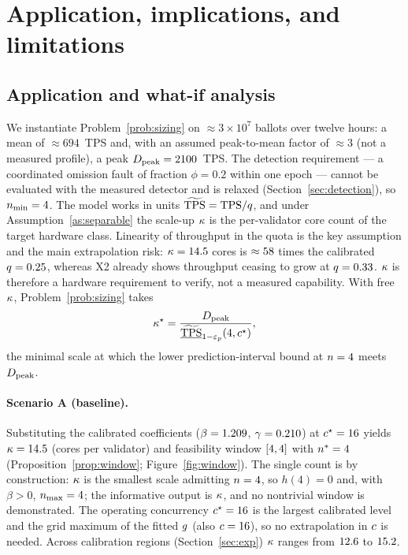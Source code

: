 \section{Application, implications, and limitations}
\label{sec:case}

\subsection{Application and what-if analysis}

We instantiate Problem~\ref{prob:sizing} on $\approx3\times10^{7}$ ballots over
twelve hours: a mean of $\approx694$~TPS and, with an assumed peak-to-mean
factor of $\approx3$ (not a measured profile), a peak $D_{\mathrm{peak}}=2100$~TPS.
The detection requirement --- a coordinated omission fault of fraction
$\phi=0.2$ within one epoch --- cannot be evaluated with the measured detector
and is relaxed (Section~\ref{sec:detection}), so $\nmin=\resNminCase$. The model
works in \RNM{} units $\widetilde{\mathrm{TPS}}=\mathrm{TPS}/q$, and under
Assumption~\ref{as:separable} the scale-up $\kappa$ is the per-validator
core count of the target hardware class. Linearity of throughput in the quota is
the key assumption and the main extrapolation risk:
$\kappa=14.5$ cores is $\approx58$ times the
calibrated $q=0.25$, whereas X2 already shows throughput ceasing to grow at
$q=0.33$. $\kappa$ is therefore a hardware requirement to verify, not a
measured capability. With free $\kappa$, Problem~\ref{prob:sizing} takes
\begin{equation}
\kappaScale^{\star}
=\frac{\Dpk}{\underline{\TPSn}_{1-\epsp}(4,\cc^{\star})},
\label{eq:kappa}
\end{equation}
the minimal scale at which the lower prediction-interval bound at $n=4$ meets
$D_{\mathrm{peak}}$.

\paragraph{Scenario A (baseline).}
Substituting the calibrated coefficients
($\beta=1.209$, $\gamma=0.210$) at $c^{\star}=16$ yields
$\kappa=14.5$ (cores per validator) and feasibility window
$[4,4]$ with $n^{\ast}=4$
(Proposition~\ref{prop:window}; Figure~\ref{fig:window}). The single count is
by construction: $\kappa$ is the smallest scale admitting $n=4$, so
$h(4)=0$ and, with $\beta>0$, $\nmax=4$; the informative output is
$\kappa$, and no nontrivial window is demonstrated. The operating
concurrency $c^{\star}=16$ is the largest calibrated level and the grid
maximum of the fitted $g$ (also $c=16$), so no extrapolation in
$c$ is needed. Across calibration regions (Section~\ref{sec:exp}) $\kappa$
ranges from $12.6$ to $15.2$.

